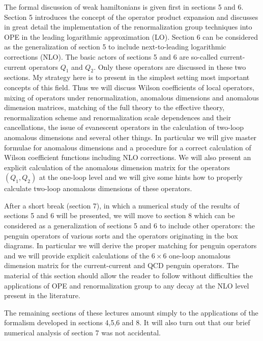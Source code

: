\documentclass[12pt,rotate]{article}
\begin{document}
The formal discussion of weak hamiltonians is given first in sections 5 and
6. Section 5 introduces the concept of the operator product expansion and
discusses in great detail the implementation of the renormalization group
techniques into OPE in the leading logarithmic approximation (LO). Section 6
can be considered as the generalization of section 5 to include
next-to-leading logarithmic corrections (NLO). The basic actors of sections 5
and 6 are so-called current-current operators $Q_1$ and $Q_2$. 
Only these
operators are discussed in these two sections. My strategy here is to present
in the simplest setting most important concepts of this field. Thus we will
discuss Wilson coefficients of local operators, mixing of operators under
renormalization, anomalous dimensions and anomalous dimension matrices,
matching of the full theory to the effective theory, renormalization scheme
and renormalization scale dependences and their cancellations, the issue of
evanescent operators in the calculation of two-loop anomalous dimensions and
several other things. In particular we will give master formulae for
anomalous dimensions and a procedure for a correct calculation of Wilson
coefficient functions including NLO corrections. We will also present an
explicit calculation of the anomalous dimension matrix for the operators
$(Q_1, Q_2)$ at the one-loop level and we will give some hints 
how to properly calculate two-loop anomalous dimensions of these operators.

After a short break (section 7), in which a numerical study of the results of
sections 5 and 6 will be presented, we will move to section 8 which can be
considered as a generalization of sections 5 and 6 to include other
operators: the penguin operators of various sorts and the operators
originating in the box diagrams. In particular we will derive the proper
matching for penguin operators and we will provide explicit calculations of
the $6\times 6$ one-loop anomalous dimension matrix for the current-current 
and QCD
penguin operators. The material of this section should allow the reader to
follow without difficulties the applications of OPE and renormalization group
to any decay at the NLO level present in the literature.

The remaining sections of these lectures amount simply to the applications of
the formalism developed in sections 4,5,6 and 8. It will also turn out that
our brief numerical analysis of section 7 was not accidental.
\end{document}

